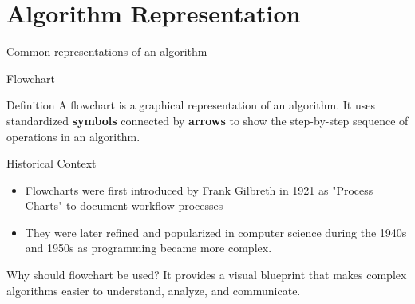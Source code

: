 \documentclass[aspectratio=169]{beamer}
\begin{document}
\section{Algorithm Representation}

\begin{frame}{Common representations of an algorithm}
  \begin{center}
  \end{center}
\end{frame}


\begin{frame}{Flowchart}

\begin{block}{Definition}
  A flowchart is a graphical representation of an algorithm. It uses standardized {\bf symbols} connected by {\bf arrows} to show the step-by-step sequence of operations in an algorithm. %
\end{block}
\begin{alertblock}{Historical Context}
      \begin{itemize}
          \item Flowcharts were first introduced by Frank Gilbreth in 1921 as "Process Charts" to document workflow processes
          \item They were later refined and popularized in computer science during the 1940s and 1950s as programming became more complex.
      \end{itemize}
      \end{alertblock}
\begin{alertblock}{Why should flowchart be used?}
      It provides a visual blueprint that makes complex algorithms easier to understand, analyze, and communicate.
      \end{alertblock}
\end{frame}
\end{document}
